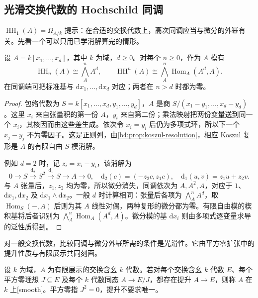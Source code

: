 \subsection{光滑交换代数的 Hochschild 同调}
\label{b4:subsec:1204:02}

\(\operatorname{HH}_1(A)=\Omega_{A/k}\) 提示：在合适的交换代数上，高次同调应当与微分的外幂有关。先看一个可以只用已学消解算完的情形。

\begin{proposition}\label{b4:prop:polynomial-hochschild}
	设 \(A=k[x_1,\ldots,x_d]\)，其中 \(k\) 为域，\(d\ge0\)。对每个 \(n\ge0\)，作为 \(A\) 模有
	\[
		\operatorname{HH}_n(A)\cong\bigwedge_A^n A^d, \qquad \operatorname{HH}^n(A)\cong \bigwedge_A^n\operatorname{Hom}_A(A^d,A).
	\]
	在同调端可把标准基与 \(\mathrm{d}x_1,\ldots,\mathrm{d}x_d\) 对应；两者在 \(n>d\) 时都为零。
\end{proposition}
\begin{proof}
	包络代数为 \(S=k[x_1,\ldots,x_d,y_1,\ldots,y_d]\)，\(A\) 是商 \(S/(x_1-y_1,\ldots,x_d-y_d)\)。这里 \(x_i\) 来自张量积的第一份 \(A\)，\(y_i\) 来自第二份；乘法映射把两份变量送到同一个 \(x_i\)，其核因而由这些差生成。依次令 \(x_i=y_i\) 后仍为多项式环，所以下一个 \(x_j-y_j\) 不为零因子。这是正则列，由\cref{b4:prop:koszul-resolution}，相应 Koszul 复形是 \(A\) 的有限自由 \(S\) 模消解。

	例如 \(d=2\) 时，记 \(z_i=x_i-y_i\)，该消解为
	\[
		0\longrightarrow S\xrightarrow{\mathrm{d}_2}S^2 \xrightarrow{\mathrm{d}_1}S\longrightarrow A\longrightarrow0, \quad \mathrm{d}_2(c)=(-z_2c,z_1c),\quad \mathrm{d}_1(u,v)=z_1u+z_2v.
	\]
	与 \(A\) 张量后，\(z_1,z_2\) 均为零，所以微分消失，同调依次为 \(A,A^2,A\)，对应于 \(1\)、\(\mathrm{d}x_1,\mathrm{d}x_2\) 及 \(\mathrm{d}x_1\wedge\mathrm{d}x_2\)。一般 \(d\) 时计算相同：张量后各项为 \(\bigwedge_A^n A^d\)，取 \(\operatorname{Hom}_S(-,A)\) 后则为其 \(A\) 线性对偶，两种复形的微分都为零。有限自由模的楔积基将后者识别为 \(\bigwedge_A^n\operatorname{Hom}_A(A^d,A)\)。微分模的基 \(\mathrm{d}x_i\) 则由多项式逐变量求导的泛性质得到。
\end{proof}

对一般交换代数，比较同调与微分外幂所需的条件是光滑性。它由平方零扩张中的提升性质与有限展示共同刻画。

\begin{definition}\label{b4:def:smooth-algebra-hh}
	设 \(k\) 为域，\(A\) 为有限展示的交换含幺 \(k\) 代数。若对每个交换含幺 \(k\) 代数 \(E\)、每个平方零理想 \(J\subseteq E\) 及每个 \(k\) 代数同态 \(A\to E/J\)，都存在提升 \(A\to E\)，则称 \(A\) 在 \(k\) 上[smooth]。平方零指 \(J^2=0\)，提升不要求唯一。
\end{definition}

